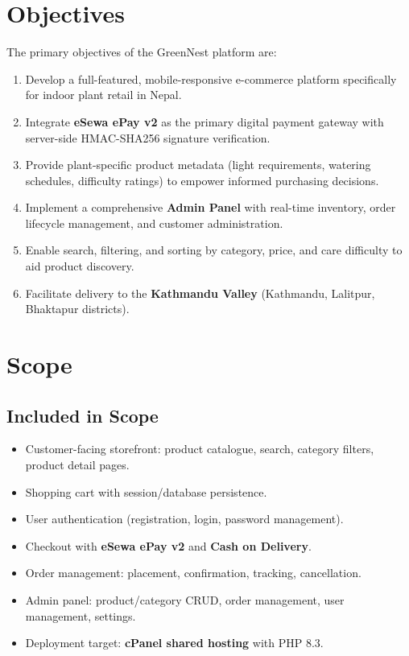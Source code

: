 \documentclass[12pt,a4paper]{report}
\begin{document}
\section{Objectives}

The primary objectives of the GreenNest platform are:

\begin{enumerate}
  \item Develop a full-featured, mobile-responsive e-commerce platform specifically for indoor plant retail in Nepal.
  \item Integrate \textbf{eSewa ePay v2} as the primary digital payment gateway with server-side HMAC-SHA256 signature verification.
  \item Provide plant-specific product metadata (light requirements, watering schedules, difficulty ratings) to empower informed purchasing decisions.
  \item Implement a comprehensive \textbf{Admin Panel} with real-time inventory, order lifecycle management, and customer administration.
  \item Enable search, filtering, and sorting by category, price, and care difficulty to aid product discovery.
  \item Facilitate delivery to the \textbf{Kathmandu Valley} (Kathmandu, Lalitpur, Bhaktapur districts).
\end{enumerate}

\section{Scope}

\subsection{Included in Scope}
\begin{itemize}
  \item Customer-facing storefront: product catalogue, search, category filters, product detail pages.
  \item Shopping cart with session/database persistence.
  \item User authentication (registration, login, password management).
  \item Checkout with \textbf{eSewa ePay v2} and \textbf{Cash on Delivery}.
  \item Order management: placement, confirmation, tracking, cancellation.
  \item Admin panel: product/category CRUD, order management, user management, settings.
  \item Deployment target: \textbf{cPanel shared hosting} with PHP 8.3.
\end{itemize}
\end{document}
